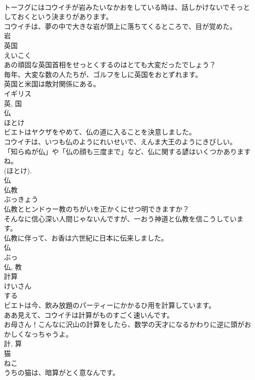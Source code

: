 \documentclass[8pt]{extreport}
\begin{document}
\begin{CJK}{UTF8}{min}
\\	トーフグにはコウイチが岩みたいなかおをしている時は、話しかけないでそっとしておくという決まりがあります。	
\\	コウイチは、夢の中で大きな岩が頭上に落ちてくるところで、目が覚めた。	
\\	岩	
\\	英国	
\\	えいこく	
\\	あの頑固な英国首相をせっとくするのはとても大変だったでしょう？	
\\	毎年、大変な数の人たちが、ゴルフをしに英国をおとずれます。	
\\	英国と米国は敵対関係にある。	
\\	イギリス 
\\	英, 国	
\\	仏	
\\	ほとけ	
\\	ビエトはヤクザをやめて、仏の道に入ることを決意しました。	
\\	コウイチは、いつも仏のようにれいせいで、えんま大王のようにきびしい。	
\\	「知らぬが仏」や「仏の顔も三度まで」など、仏に関する諺はいくつかありますね。	
\\	(ほとけ). 
\\	仏	
\\	仏教	
\\	ぶっきょう	
\\	仏教とヒンドゥー教のちがいを正かくにせつ明できますか？	
\\	そんなに信心深い人間じゃないんですが、一おう神道と仏教を信こうしています。	
\\	仏教に伴って、お香は六世紀に日本に伝来しました。	
\\	仏 
\\	ぶっ 
\\	仏, 教	
\\	計算	
\\	けいさん	
\\	する 
\\	ビエトは今、飲み放題のパーティーにかかるひ用を計算しています。	
\\	ああ見えて、コウイチは計算がものすごく速いんです。	
\\	お母さん！こんなに沢山の計算をしたら、数学の天才になるかわりに逆に頭がおかしくなっちゃうよ。	
\\	計, 算	
\\	猫	
\\	ねこ	
\\	うちの猫は、暗算がとく意なんです。	

\end{CJK}
\end{document}
